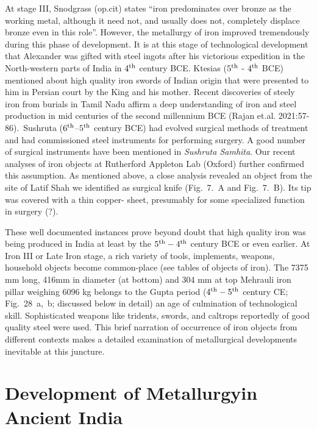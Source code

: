 At stage III, Snodgrass (op.cit) states “iron predominates over bronze as the working metal, although it need not, and usually does not, completely displace bronze even in this role”. However, the metallurgy of iron improved tremendously during this phase of development. It is at this stage of technological development that Alexander was gifted with steel ingots after his victorious expedition in the North-western parts of India in $4^{\rm th}$ century BCE. Ktesias ($5^{\rm th}$ - $4^{\rm th}$ BCE) mentioned about high quality iron swords of Indian origin that were presented to him in Persian court by the King and his mother. Recent discoveries of steely iron from burials in Tamil Nadu affirm a deep understanding of iron and steel production in mid centuries of the second millennium BCE (Rajan et.al. 2021:57-86).~Sushruta ($6^{\rm th}$–$5^{\rm th}$ century BCE) had evolved surgical methods of treatment and had commissioned steel instruments for performing surgery. A good number of surgical instruments have been mentioned in {\it Sushruta Samhita}. Our recent analyses of iron objects at Rutherford Appleton Lab (Oxford) further confirmed this assumption. As mentioned above, a close analysis revealed an object from the site of Latif Shah we identified as surgical knife (Fig.~7.~A and Fig.~7.~B). Its tip was covered with a thin copper- sheet, presumably for some specialized function in surgery (?). 

These well documented instances prove beyond doubt that high quality iron was being produced in India at least by the $5^{\rm th} - 4^{\rm th}$ century BCE or even earlier. At Iron III or Late Iron stage, a rich variety of tools, implements, weapons, household objects become common-place (see tables of objects of iron). The 7375 mm long, 416mm in diameter (at bottom) and 304 mm at top Mehrauli iron pillar weighing 6096 kg belongs to the Gupta period ($4^{\rm th}-5^{\rm th}$ century CE; Fig.~28~a,~b; discussed below in detail) an age of culmination of technological skill. Sophisticated weapons like tridents, swords, and caltrops reportedly of good quality steel were used. This brief narration of occurrence of iron objects from different contexts makes a detailed examination of metallurgical developments inevitable at this juncture.

\vspace{-.3cm}

\section*{Development of Metallurgy\hfill \break in Ancient India}\label{section-1}

